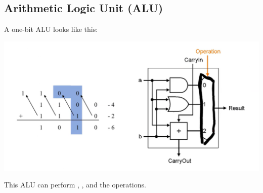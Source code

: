 \documentclass[letterpaper]{article}
\begin{document}
\subsection{Arithmetic Logic Unit (ALU)}
A one-bit ALU looks like this:
\begin{center}
    \includegraphics[scale=0.5]{img/1b_alu.PNG}
\end{center}
This ALU can perform , , and the  operations. 
\end{document}
